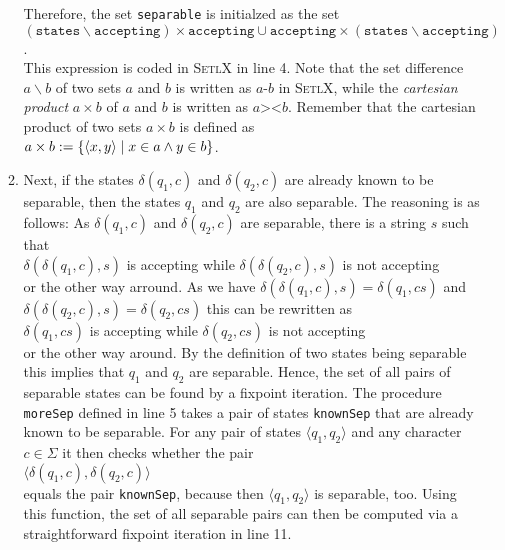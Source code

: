\begin{enumerate}
\begin{enumerate}
            Therefore, the set \texttt{separable} is initialzed as the set
            \\[0.2cm]
            \hspace*{1.3cm}
            $(\mathtt{states}\backslash \mathtt{accepting}) \times \mathtt{accepting} \cup
             \mathtt{accepting} \times (\mathtt{states}\backslash \mathtt{accepting})  
            $.
            \\[0.2cm]
            This expression is coded in \textsc{SetlX} in line 4.  Note that
            the set difference $a \backslash b$ of two sets $a$ and $b$ is written as
            $a \texttt{-} b$ in \textsc{SetlX}, while the \emph{cartesian product} 
            $a \times b$ of $a$ and $b$ is written as $a \texttt{><} b$.  Remember that the
            cartesian product of two sets $a \times b$ is defined as 
            \\[0.2cm]
            \hspace*{1.3cm}
            $a \times b := \{ \pair(x,y) \mid x \in a \wedge y \in b \}$.
      \item Next, if the states $\delta(q_1,c)$ and $\delta(q_2,c)$ are already known
            to be separable, then the states $q_1$ and $q_2$ are also separable.  The
            reasoning is as follows:  As $\delta(q_1,c)$ and $\delta(q_2,c)$ are separable,
            there is a string $s$ such that
            \\[0.2cm]
            \hspace*{1.3cm}
            $\delta(\delta(q_1,c), s)$ is accepting \quad while \quad
            $\delta(\delta(q_2,c), s)$ is not accepting 
            \\[0.2cm]
            or the other way arround.  As we have $\delta(\delta(q_1,c), s) = \delta(q_1, cs)$
            and $\delta(\delta(q_2,c), s) = \delta(q_2, cs)$ this can be rewritten as
            \\[0.2cm]
            \hspace*{1.3cm}
            $\delta(q_1,cs)$ is accepting \quad while \quad
            $\delta(q_2,cs)$ is not accepting
            \\[0.2cm]
            or the other way around.  
            By the definition of two states being separable 
            this implies that $q_1$ and $q_2$ are separable. 
            Hence, the set of all pairs of separable states can be found by a fixpoint
            iteration. 
            The procedure \texttt{moreSep} defined in line 5 takes a pair of states
            \texttt{knownSep} that are already known to be separable.  For any pair of states
           $\langle q_1, q_2 \rangle$ and any character $c \in \Sigma$ it then checks whether the pair
           \\[0.2cm]
           \hspace*{1.3cm}
           $\langle \delta(q_1,c), \delta(q_2, c) \rangle$
           \\[0.2cm]
           equals the pair \texttt{knownSep}, because then $\langle q_1, q_2 \rangle$ is separable,
           too.  Using this function, the set of all separable pairs can then be computed via a
           straightforward fixpoint iteration in line 11.


\end{enumerate}
\end{enumerate}
